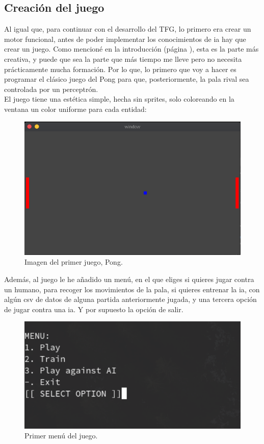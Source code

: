 \subsection{Creación del juego}
Al igual que, para continuar con el desarrollo del TFG, lo primero era crear un motor funcional, antes de poder implementar los conocimientos de \gls{ia} hay que crear un juego. Como mencioné en la introducción (página \pageref{introduccion}), esta es la parte más creativa, y puede que sea la parte que más tiempo me lleve pero no necesita prácticamente mucha formación. Por lo que, lo primero que voy a hacer es programar el clásico juego del Pong para que, posteriormente, la pala rival sea controlada por un perceptrón. 
\\
El juego tiene una estética simple, hecha sin sprites, solo coloreando en la ventana un color uniforme para cada entidad:
\begin{figure}[h]
	\centering
	\includegraphics[width=15cm]{archivos/imagenes/pong.png}
	\caption{Imagen del primer juego, Pong.}
\end{figure}

Además, al juego le he añadido un menú, en el que eliges si quieres jugar contra un humano, para recoger los movimientos de la pala, si quieres entrenar la \gls{ia}, con algún \gls{csv} de datos de alguna partida anteriormente jugada, y una tercera opción de jugar contra una \gls{ia}. Y por supuesto la opción de salir.
\begin{figure}[h]
	\centering
	\includegraphics[width=15cm]{archivos/imagenes/menu-del-pong.png}
	\caption{Primer menú del juego.}
\end{figure}


